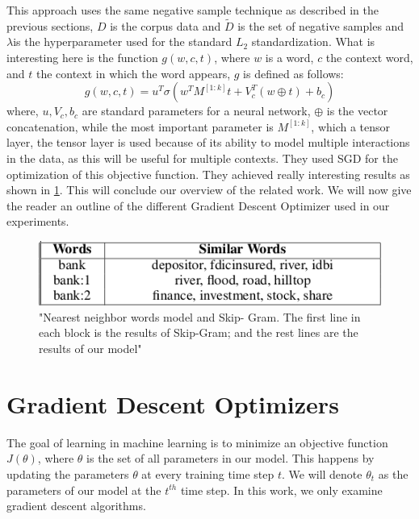 This approach uses the same negative sample technique as described in the previous sections, $D$ is the corpus data and $\tilde{D}$ is the set of negative samples and $\lambda$is the hyperparameter used for the standard $L_2$ standardization. What is interesting here is the function $g(w,c,t)$, where $w$ is a word, $c$ the context word, and $t$ the context in which the word appears, $g$ is defined as follows: 
\begin{equation}
g(w,c,t) = u^T \sigma(w^TM^{[1:k]}t+V_c^T(w \oplus t) + b_c)
\end{equation}
where, $u, V_c, b_c$ are standard parameters for a neural network, $\oplus$ is the vector concatenation, while the most important parameter is $M^{[1:k]}$, which a tensor layer, the tensor layer is used because of its ability to model multiple interactions in the data, as this will be useful for multiple contexts. They used SGD for the optimization of this objective function.  They achieved really interesting results as shown in \ref{fig:multipleContext}. This will conclude our overview of the related work. We will now give the reader an outline of the different Gradient Descent Optimizer used in our experiments.
\begin{figure}[ht]
    \centering
            \includegraphics[scale=0.7]{images/multipleContext.png} 
    \caption{"Nearest neighbor words model and Skip-
Gram. The first line in each block is the results of Skip-Gram;
and the rest lines are the results of our model" \cite{contextWithTensor}}
    \label{fig:multipleContext}
\end{figure}

\section{Gradient Descent Optimizers} \label{optimizers}
The goal of learning in machine learning is to minimize an objective function  $J(\theta)$, where $\theta$ is the set of all parameters in our model. This happens by updating the parameters $\theta$ at every training time step $t$. We will denote $\theta_{t}$ as the parameters of our model at the $t^{th}$ time step. In this work, we only examine gradient descent algorithms.
